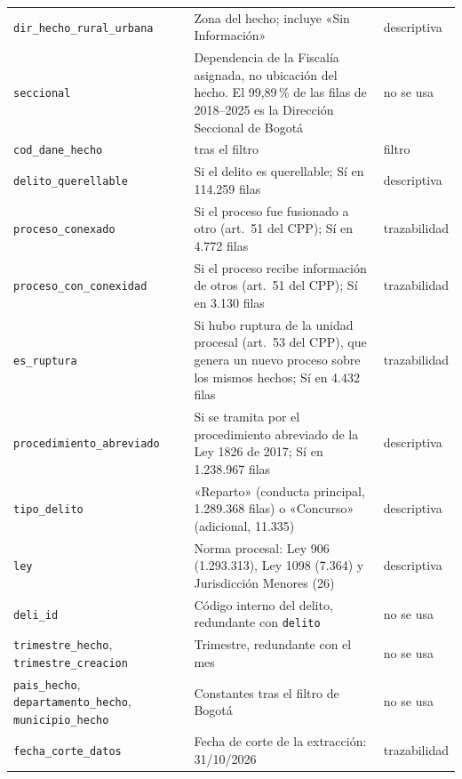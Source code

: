 {\begin{longtable}{@{}>{\raggedright\arraybackslash}p{4.2cm}>{\raggedright\arraybackslash}p{8.6cm}>{\raggedright\arraybackslash}p{2.2cm}@{}}
\texttt{dir\_\allowbreak{}hecho\_\allowbreak{}rural\_\allowbreak{}urbana} & Zona del hecho; incluye «Sin Información» & descriptiva \\
\texttt{seccional} & Dependencia de la Fiscalía asignada, no ubicación del hecho. El 99,89\,\% de las filas de 2018--2025 es la Dirección Seccional de Bogotá & no se usa \\
\texttt{cod\_\allowbreak{}dane\_\allowbreak{}hecho} & 11001 tras el filtro & filtro \\
\texttt{delito\_\allowbreak{}querellable} & Si el delito es querellable; Sí en 114.259 filas & descriptiva \\
\texttt{proceso\_\allowbreak{}conexado} & Si el proceso fue fusionado a otro (art.~51 del CPP); Sí en 4.772 filas & trazabilidad \\
\texttt{proceso\_\allowbreak{}con\_\allowbreak{}conexidad} & Si el proceso recibe información de otros (art.~51 del CPP); Sí en 3.130 filas & trazabilidad \\
\texttt{es\_\allowbreak{}ruptura} & Si hubo ruptura de la unidad procesal (art.~53 del CPP), que genera un nuevo proceso sobre los mismos hechos; Sí en 4.432 filas & trazabilidad \\
\texttt{procedimiento\_\allowbreak{}abreviado} & Si se tramita por el procedimiento abreviado de la Ley 1826 de 2017; Sí en 1.238.967 filas & descriptiva \\
\texttt{tipo\_\allowbreak{}delito} & «Reparto» (conducta principal, 1.289.368 filas) o «Concurso» (adicional, 11.335) & descriptiva \\
\texttt{ley} & Norma procesal: Ley 906 (1.293.313), Ley 1098 (7.364) y Jurisdicción Menores (26) & descriptiva \\
\texttt{deli\_\allowbreak{}id} & Código interno del delito, redundante con \texttt{delito} & no se usa \\
\texttt{trimestre\_\allowbreak{}hecho}, \texttt{trimestre\_\allowbreak{}creacion} & Trimestre, redundante con el mes & no se usa \\
\texttt{pais\_\allowbreak{}hecho}, \texttt{departamento\_\allowbreak{}hecho}, \texttt{municipio\_\allowbreak{}hecho} & Constantes tras el filtro de Bogotá & no se usa \\
\texttt{fecha\_\allowbreak{}corte\_\allowbreak{}datos} & Fecha de corte de la extracción: 31/10/2026 & trazabilidad \\
\bottomrule
\end{longtable}

}

